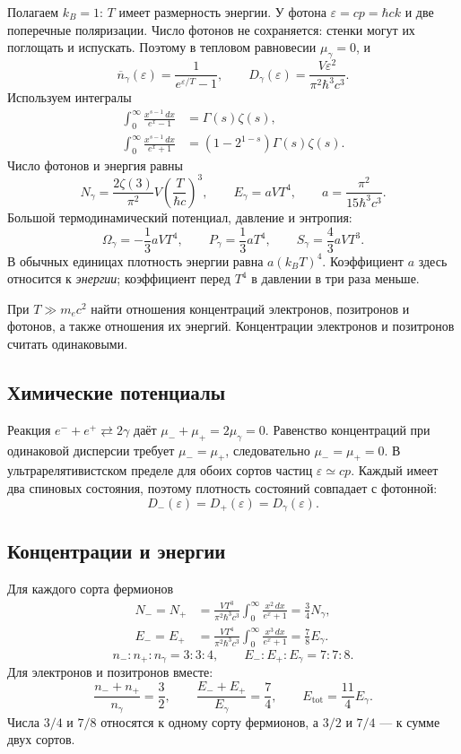 \documentclass[../final.tex]{subfiles}
\begin{document}

Полагаем $k_B=1$: $T$ имеет размерность энергии. У фотона
$\varepsilon=cp=\hbar ck$ и две поперечные поляризации.
Число фотонов не сохраняется: стенки могут их поглощать и испускать.
Поэтому в тепловом равновесии $\mu_\gamma=0$, и
\[
 \overline n_\gamma(\varepsilon)=\frac1{e^{\varepsilon/T}-1},\qquad
 D_\gamma(\varepsilon)=\frac{V\varepsilon^2}{\pi^2\hbar^3c^3}.
\]
Используем интегралы
\begin{align*}
 \int_0^\infty\frac{x^{s-1}\,dx}{e^x-1}&=\Gamma(s)\zeta(s),\\
 \int_0^\infty\frac{x^{s-1}\,dx}{e^x+1}
 &=(1-2^{1-s})\Gamma(s)\zeta(s).
\end{align*}
Число фотонов и энергия равны
\[
 N_\gamma=\frac{2\zeta(3)}{\pi^2}V
 \left(\frac{T}{\hbar c}\right)^3,\qquad
 E_\gamma=aVT^4,\qquad a=\frac{\pi^2}{15\hbar^3c^3}.
\]
Большой термодинамический потенциал, давление и энтропия:
\[
 \Omega_\gamma=-\frac13aVT^4,\qquad
 P_\gamma=\frac13aT^4,\qquad S_\gamma=\frac43aVT^3.
\]
В обычных единицах плотность энергии равна $a(k_BT)^4$.
Коэффициент $a$ здесь относится к \emph{энергии}; коэффициент
перед $T^4$ в давлении в три раза меньше.

\clearpage
{}
\condition
При $T\gg m_ec^2$ найти отношения концентраций электронов,
позитронов и фотонов, а также отношения их энергий.
Концентрации электронов и позитронов считать одинаковыми.

\subsection*{Химические потенциалы}
Реакция $e^-+e^+\rightleftarrows2\gamma$ даёт
$\mu_-+\mu_+=2\mu_\gamma=0$.
Равенство концентраций при одинаковой дисперсии требует
$\mu_-=\mu_+$, следовательно $\mu_-=\mu_+=0$.
В ультрарелятивистском пределе для обоих сортов частиц
$\varepsilon\simeq cp$. Каждый имеет два спиновых состояния,
поэтому плотность состояний совпадает с фотонной:
\[
 D_-(\varepsilon)=D_+(\varepsilon)=D_\gamma(\varepsilon).
\]

\subsection*{Концентрации и энергии}
Для каждого сорта фермионов
\begin{align*}
 N_- = N_+&=\frac{VT^3}{\pi^2\hbar^3c^3}
 \int_0^\infty\frac{x^2\,dx}{e^x+1}
 =\frac34N_\gamma,\\
 E_- = E_+&=\frac{VT^4}{\pi^2\hbar^3c^3}
 \int_0^\infty\frac{x^3\,dx}{e^x+1}
 =\frac78E_\gamma.
\end{align*}
\answer
\[
 \boxed{n_-:n_+:n_\gamma=3:3:4},\qquad
 \boxed{E_-:E_+:E_\gamma=7:7:8}.
\]
Для электронов и позитронов вместе:
\[
 \frac{n_-+n_+}{n_\gamma}=\frac32,\qquad
 \frac{E_-+E_+}{E_\gamma}=\frac74,\qquad
 E_{\mathrm{tot}}=\frac{11}{4}E_\gamma.
\]
Числа $3/4$ и $7/8$ относятся к одному сорту фермионов,
а $3/2$ и $7/4$ --- к сумме двух сортов.
\end{document}
